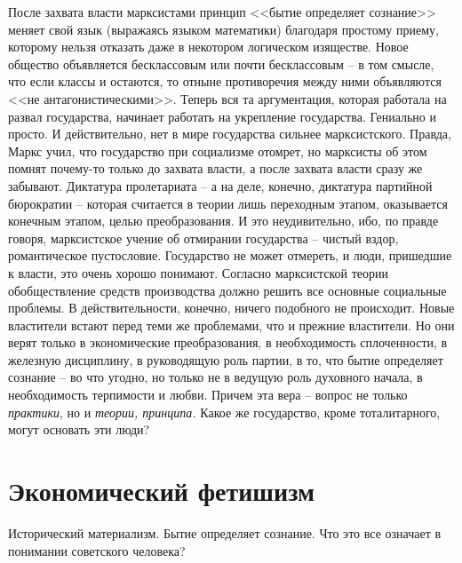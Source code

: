 \documentclass{book}
\begin{document}
После захвата власти марксистами принцип <<бытие определяет сознание>> меняет свой язык (выражаясь языком мате­матики) благодаря 
простому приему, которому нельзя отказать даже в некотором логическом изяществе. Новое общество объявляется бесклассовым или 
почти бесклассовым -- в том смысле, что если классы и остаются, то отныне противоречия между ними объявляются <<не 
антагонистическими>>. Теперь вся та аргументация, которая работала на развал государства, начинает работать на укрепление 
государства. Гениально и просто. И действительно, нет в мире государства сильнее марк­систского. Правда, Маркс учил, что 
государство при социализ­ме отомрет, но марксисты об этом помнят почему-то только до захвата власти, а после захвата власти сразу 
же забывают. Дик­татура пролетариата -- а на деле, конечно, диктатура партийной бюрократии -- которая считается в теории лишь 
переходным этапом, оказывается конечным этапом, целью преобразования. И это неудивительно, ибо, по правде говоря, марксистское 
уче­ние об отмирании государства -- чистый вздор, романтическое пустословие. Государство не может отмереть, и люди, пришед­шие к 
власти, это очень хорошо понимают. Согласно марксист­ской теории обобществление средств производства должно ре­шить все основные 
социальные проблемы. В действительности, конечно, ничего подобного не происходит. Новые властители встают перед теми же 
проблемами, что и прежние властители. Но они верят только в экономические преобразования, в необ­ходимость сплоченности, в 
железную дисциплину, в руководя­щую роль партии, в то, что бытие определяет сознание -- во что угодно, но только не в ведущую 
роль духовного начала, в необходимость терпимости и любви. Причем эта вера -- вопрос не только \textit{практики},  но и 
\textit{теории, принципа.}  Какое же государст­во, кроме тоталитарного, могут основать эти люди?



\section{Экономический фетишизм}

Исторический материализм. Бытие определяет сознание. Что это все означает в понимании советского человека?
\end{document}
